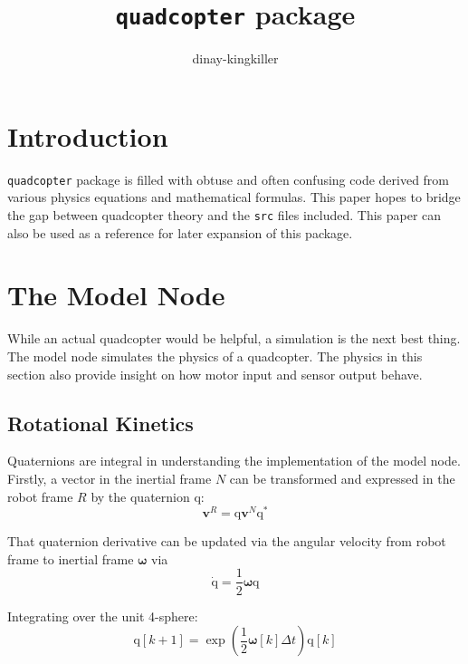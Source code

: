 \documentclass[lettersize,journal]{IEEEtran}
\begin{document}
\title{\texttt{quadcopter} package}
\author{dinay-kingkiller}

\maketitle


\section{Introduction}
 \texttt{quadcopter} package is filled with obtuse and often confusing code derived from various physics equations and mathematical formulas. This paper hopes to bridge the gap between quadcopter theory and the \texttt{src} files included. This paper can also be used as a reference for later expansion of this package.

\section{The Model Node}
While an actual quadcopter would be helpful, a simulation is the next best thing. The model node simulates the physics of a quadcopter. The physics in this section also provide insight on how motor input and sensor output behave.

\subsection{Rotational Kinetics}

Quaternions are integral in understanding the implementation of the model node. Firstly, a vector in the inertial frame $N$ can be transformed and expressed in the robot frame $R$ by the quaternion $\mathrm{q}$:
\begin{equation}
	\mathbf{v}^R = \mathrm{q} \mathbf{v}^N \mathrm{q}^*
\end{equation}

That quaternion derivative can be updated via the angular velocity from robot frame to inertial frame $\boldsymbol\omega$ via
\begin{equation}
	\mathrm{\dot{q}} = \frac{1}{2} \boldsymbol\omega \mathrm{q}
\end{equation}

Integrating over the unit 4-sphere:
\begin{equation}
	\mathrm{q}[k+1] = \exp\left(\frac{1}{2}\boldsymbol\omega[k] \Delta t\right) \mathrm{q}[k]
\end{equation}
\end{document}
